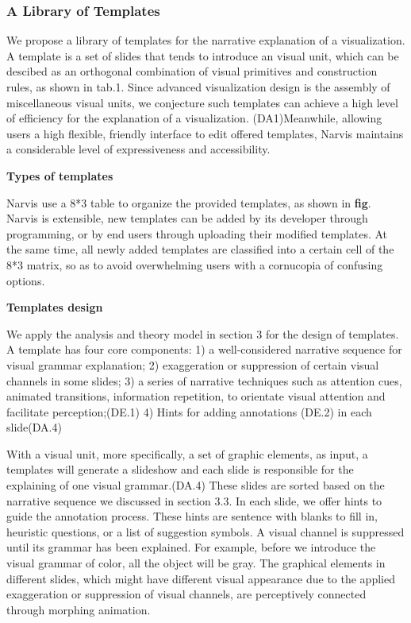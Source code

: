 \subsubsection{A Library of Templates}
We propose a library of templates for the narrative explanation of a visualization. A template is a set of slides that tends to introduce an visual unit, which can be descibed as an orthogonal combination of visual primitives and construction rules, as shown in tab.1. Since advanced visualization design is the assembly of miscellaneous visual units, we conjecture such templates can achieve a high level of efficiency for the explanation of a visualization. (DA1)Meanwhile, allowing users a high flexible, friendly interface to edit offered templates, Narvis maintains a considerable level of expressiveness and accessibility. 

\textbf{Types of templates}

Narvis use a 8*3 table to organize the provided templates, as shown in \textbf{fig}. Narvis is extensible, new templates can be added by its developer through programming, or by end users through uploading their modified templates. At the same time, all newly added templates are classified into a certain cell of the 8*3 matrix, so as to avoid overwhelming users with a cornucopia of confusing options.

\textbf{Templates design}

We apply the analysis and theory model in section 3 for the design of templates. A template has four core components: 1) a well-considered narrative sequence for visual grammar explanation; 2) exaggeration or suppression of certain visual channels in some slides; 3) a series of narrative techniques such as attention cues, animated transitions, information repetition, to orientate visual attention and facilitate perception;(DE.1) 4) Hints for adding annotations (DE.2) in each slide(DA.4)

With a visual unit, more specifically, a set of graphic elements, as input, a templates will generate a slideshow and each slide is responsible for the explaining of one visual grammar.(DA.4) These slides are sorted based on the narrative sequence we discussed in section 3.3. In each slide, we offer hints to guide the annotation process. These hints are sentence with blanks to fill in, heuristic questions, or a list of suggestion symbols. A visual channel is suppressed until its grammar has been explained. For example, before we introduce the visual grammar of color, all the object will be gray.  The graphical elements in different slides, which might have different visual appearance due to the applied exaggeration or suppression of visual channels, are perceptively connected through morphing animation.

